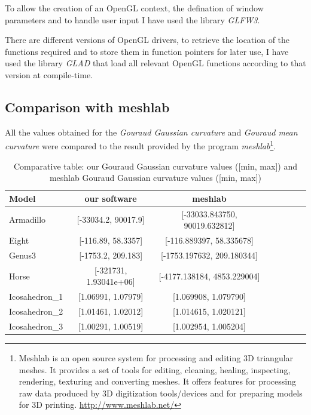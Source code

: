 To allow the creation of an OpenGL context, the defination of window parameters and to handle user input I have used the library \textit{GLFW3}.

There are different versions of OpenGL drivers, to retrieve the location of the functions required and to store them in function pointers for later use, I have used the library \textit{GLAD} that load all relevant OpenGL functions according to that version at compile-time.

\subsection{Comparison with meshlab}
All the values obtained for the \textit{Gouraud Gaussian curvature} and \textit{Gouraud mean curvature} were compared to the result provided by the program \textit{meshlab}\footnote{Meshlab is an open source system for processing and editing 3D triangular meshes.
It provides a set of tools for editing, cleaning, healing, inspecting, rendering, texturing and converting meshes. It offers features for processing raw data produced by 3D digitization tools/devices and for preparing models for 3D printing. \url{http://www.meshlab.net/}}.


\begin{table}[!h]%
    \centering
\begin{tabular}{l*{6}{c}r}
    \centering
    Model              & our software &  meshlab \\
    \hline
    Armadillo          & [-33034.2, 90017.9] & [-33033.843750, 90019.632812] \\
    Eight              & [-116.89, 58.3357] & [-116.889397, 58.335678] \\
    Genus3             & [-1753.2, 209.183] & [-1753.197632, 209.180344]  \\
    Horse              & [-321731, 1.93041e+06] &  [-4177.138184, 4853.229004]\\
    Icosahedron\_1      &  [1.06991, 1.07979] & [1.069908, 1.079790] \\
    Icosahedron\_2      &  [1.01461, 1.02012] & [1.014615, 1.020121] \\
    Icosahedron\_3      & [1.00291, 1.00519] &  [1.002954, 1.005204]
\end{tabular}
\caption{Comparative table: our Gouraud Gaussian curvature values ([min, max]) and meshlab Gouraud Gaussian curvature values ([min, max])}
\label{table:table-gaussian-meshlab}
\end{table}



